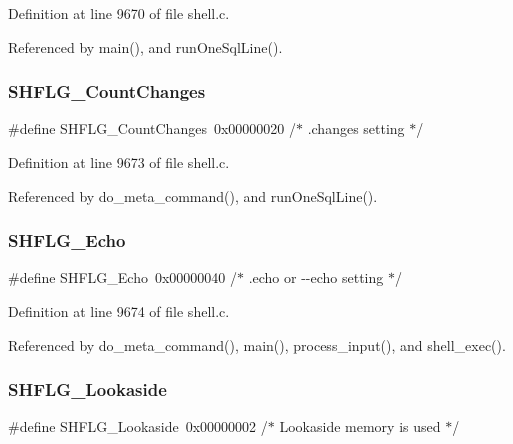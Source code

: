 Definition at line 9670 of file shell.\+c.



Referenced by main(), and run\+One\+Sql\+Line().

\mbox{\label{shell_8c_ab87bdefc070646a521e8773e2006c267}} 
\subsubsection{S\+H\+F\+L\+G\+\_\+\+Count\+Changes}
{\footnotesize\ttfamily \#define S\+H\+F\+L\+G\+\_\+\+Count\+Changes~0x00000020 /$\ast$ .\+changes setting $\ast$/}



Definition at line 9673 of file shell.\+c.



Referenced by do\+\_\+meta\+\_\+command(), and run\+One\+Sql\+Line().

\mbox{\label{shell_8c_a8fe736a8e01d51b81dd77324b9c8d270}} 
\subsubsection{S\+H\+F\+L\+G\+\_\+\+Echo}
{\footnotesize\ttfamily \#define S\+H\+F\+L\+G\+\_\+\+Echo~0x00000040 /$\ast$ .\+echo or -\/-\/echo setting $\ast$/}



Definition at line 9674 of file shell.\+c.



Referenced by do\+\_\+meta\+\_\+command(), main(), process\+\_\+input(), and shell\+\_\+exec().

\mbox{\label{shell_8c_a5886586f94d920aeb9e29f544d7afbc5}} 
\subsubsection{S\+H\+F\+L\+G\+\_\+\+Lookaside}
{\footnotesize\ttfamily \#define S\+H\+F\+L\+G\+\_\+\+Lookaside~0x00000002 /$\ast$ Lookaside memory is used $\ast$/}



